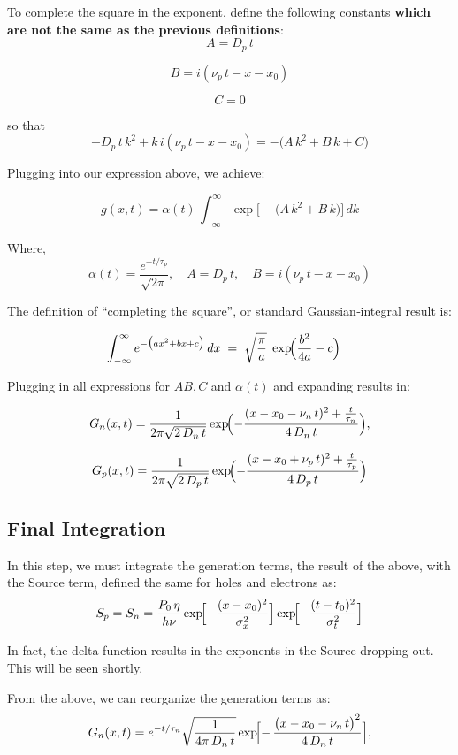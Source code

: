 \documentclass[
  journal,
]{IEEEtran}%
\begin{document}
To complete the square in the exponent, define the following constants
\textbf{which are not the same as the previous definitions}: \[
A = D_p\,t
\]

\[
B = i(\nu_p\,t - x - x_0)
\]

\[
C = 0
\]

so that\\
\[
-D_p\,t\,k^2 + k\,i(\nu_p\,t - x - x_0)
= -\bigl(A\,k^2 + B\,k + C\bigr)
\]

Plugging into our expression above, we achieve:

\[
g(x,t)
= \alpha(t)\,
  \int_{-\infty}^{\infty}
    \exp\!\bigl[-\bigl(A\,k^2 + B\,k\bigr)\bigr]\,
  dk
\]

Where,\\
\[
\alpha(t) = \frac{e^{-t/\tau_p}}{\sqrt{2\pi}},\quad
A = D_p\,t,\quad
B = i(\nu_p\,t - x - x_0)
\]

The definition of ``completing the square'', or standard
Gaussian‐integral result is:

\[
\int_{-\infty}^{\infty}
e^{-\bigl(a x^2 + b x + c\bigr)}\,dx
\;=\;
\sqrt{\frac{\pi}{a}}\;
\exp\!\Bigl(\frac{b^2}{4a}-c\Bigr)
\quad 
\]

Plugging in all expressions for \(A B, C\) and \(\alpha(t)\) and
expanding results in:

\[
G_n(x,t)
= \frac{1}{2\pi\sqrt{2\,D_n\,t}}
  \exp\!\Bigl(-\frac{(x - x_0 - \nu_n\,t)^{2} + \tfrac{t}{\tau_n}}{4\,D_n\,t}\Bigr),
\]

\[
G_p(x,t)
= \frac{1}{2\pi\sqrt{2\,D_p\,t}}
  \exp\!\Bigl(-\frac{(x - x_0 + \nu_p\,t)^{2} + \tfrac{t}{\tau_p}}{4\,D_p\,t}\Bigr)
\]

\subsection*{Final Integration}\label{final-integration}

In this step, we must integrate the generation terms, the result of the
above, with the Source term, defined the same for holes and electrons
as: \[
S_p = S_n = \frac{P_0\,\eta}{h\nu}
\exp\!\Bigl[-\frac{(x - x_0)^2}{\sigma_x^2}\Bigr]
\exp\!\Bigl[-\frac{(t - t_0)^2}{\sigma_t^2}\Bigr]
\]

In fact, the delta function results in the exponents in the Source
dropping out. This will be seen shortly.

From the above, we can reorganize the generation terms as: \[
G_n(x,t)
= e^{-t/\tau_n}
\sqrt{\frac{1}{4\pi\,D_n\,t}}
\exp\!\Bigl[-\,\frac{\bigl(x - x_0 - \nu_n\,t\bigr)^2}{4\,D_n\,t}\Bigr],
\]
\end{document}
